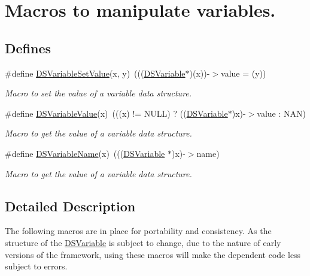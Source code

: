\hypertarget{group___d_s___v_a_r_i_a_b_l_e___a_c_c_e_s_s_o_r_y}{
\section{Macros to manipulate variables.}
\label{group___d_s___v_a_r_i_a_b_l_e___a_c_c_e_s_s_o_r_y}
}
\subsection*{Defines}
\begin{DoxyCompactItemize}
\item 
\#define \hyperlink{group___d_s___v_a_r_i_a_b_l_e___a_c_c_e_s_s_o_r_y_ga218a0d1de0bb5ea62d7e5aa22fe50793}{DSVariableSetValue}(x, y)~(((\hyperlink{struct_d_s_variable}{DSVariable}$\ast$)(x))-\/$>$value = (y))
\begin{DoxyCompactList}\small\item\em Macro to set the value of a variable data structure. \item\end{DoxyCompactList}\item 
\#define \hyperlink{group___d_s___v_a_r_i_a_b_l_e___a_c_c_e_s_s_o_r_y_ga837d0718b28591df6f518eb50d98082a}{DSVariableValue}(x)~(((x) != NULL) ? ((\hyperlink{struct_d_s_variable}{DSVariable}$\ast$)x)-\/$>$value : NAN)
\begin{DoxyCompactList}\small\item\em Macro to get the value of a variable data structure. \item\end{DoxyCompactList}\item 
\#define \hyperlink{group___d_s___v_a_r_i_a_b_l_e___a_c_c_e_s_s_o_r_y_ga64afbf5e8e378ef611c25084211152c4}{DSVariableName}(x)~(((\hyperlink{struct_d_s_variable}{DSVariable} $\ast$)x)-\/$>$name)
\begin{DoxyCompactList}\small\item\em Macro to get the value of a variable data structure. \item\end{DoxyCompactList}\end{DoxyCompactItemize}


\subsection{Detailed Description}
The following macros are in place for portability and consistency. As the structure of the \hyperlink{struct_d_s_variable}{DSVariable} is subject to change, due to the nature of early versions of the framework, using these macros will make the dependent code less subject to errors. 

